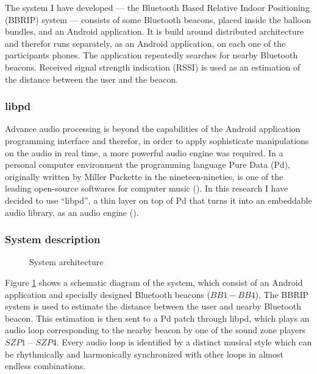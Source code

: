\documentclass[a4paper,11pt]{article}
\begin{document}
The system I have developed --- the Bluetooth Based Relative Indoor Positioning (BBRIP) system --- consists of some Bluetooth beacons, placed inside the balloon bundles, and an Android application.
It is build around distributed architecture and therefor runs separately, as an Android application, on each one of the participants phones.
The application repeatedly searches for nearby Bluetooth beacons.
Received signal strength indication (RSSI) is used as an estimation of the distance between the user and the beacon.

\subsubsection{libpd}\label{methods:libpd}

Advance audio processing is beyond the capabilities of the Android application programming interface and therefor, in order to apply sophisticate manipulations on the audio in real time, a more powerful audio engine was required.
In a personal computer environment the programming language Pure Data (Pd), originally written by Miller Puckette in the nineteen-nineties, is one of the leading open-source softwares for computer music (\citeauthor{web:pd}).
In this research I have decided to use ``libpd'', a thin layer on top of Pd that turns it into an embeddable audio library, as an audio engine (\cite[p. v]{brinkmann12}).

\subsubsection{System description}\label{systemdescription}

\begin{figure}[!htb]
	\centering
	\def\svgwidth{0.9\textwidth}
	
	\caption{System architecture}\label{fig:sys:architecture}
\end{figure}

Figure \ref{fig:sys:architecture} shows a schematic diagram of the system, which consist of an Android application and specially designed Bluetooth beacons ($BB1 - BB4$).
The BBRIP system is used to estimate the distance between the user and nearby Bluetooth beacon.
This estimation is then sent to a Pd patch through libpd, which plays an audio loop corresponding to the nearby beacon by one of the sound zone players $SZP1$ -- $SZP4$.
Every audio loop is identified by a distinct musical style which can be rhythmically and harmonically synchronized with other loops in almost endless combinations.
\end{document}
